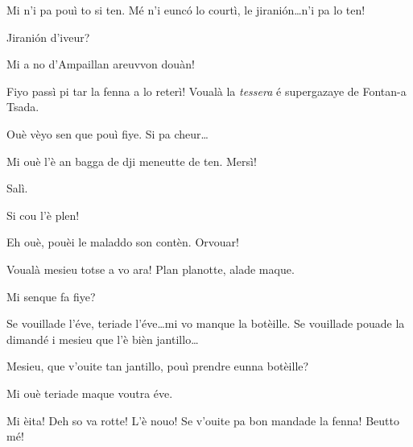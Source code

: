 \begin{drama}
\Prosperospeaks Mi n'i pa pouì to si ten. Mé n'i eunc\'o lo courtì, le jirani\'on\ldots n'i pa lo ten!

\Lucianospeaks Jirani\'on d'iveur?

\Prosperospeaks Mi a no d'Ampaillan areuvvon douàn!

\Lucianospeaks{} Fiyo passì pi tar la fenna a lo reterì!  Voualà la \textit{tessera} é supergazaye de Fontan-a Tsada.

\Prosperospeaks Ouè vèyo sen que pouì fiye. Si pa cheur\ldots 

\Lucianospeaks Mi ouè l'è an bagga de dji meneutte de ten. Mersì!

\Prosperospeaks Salì.


\Prosperospeaks{} Si cou l'è plen!

\Volonterospeaks Eh ouè, pouèi le maladdo son contèn. Orvouar!



\Valletspeaks{}  Voualà mesieu totse a vo ara! Plan planotte, alade maque.


\Vetchotspeaks{} Mi senque fa fiye?

\Valletspeaks Se vouillade l'éve, teriade l'éve\ldots mi vo manque la botèille. Se vouillade pouade la dimandé i mesieu  que l'è bièn jantillo\ldots


\Vetchotspeaks {} Mesieu, que v'ouite tan jantillo, pouì prendre eunna botèille?

\Prosperospeaks{} Mi ouè teriade maque voutra éve.


\Prosperospeaks Mi èita! Deh so va rotte! L'è nouo! Se v'ouite pa bon mandade la fenna! Beutto mé!


\end{drama}
